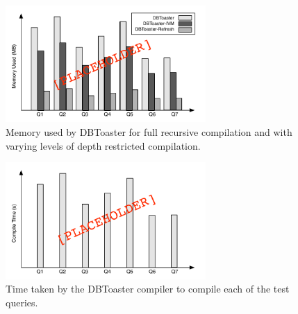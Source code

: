 \begin{figure}
\begin{center}
\includegraphics[width=3in]{../graphics-tmp/placeholder_memory_all}
\end{center}
\label{fig:exp:bakeoff}
\caption{Memory used by DBToaster for full recursive compilation and with varying levels of depth restricted compilation.}
\end{figure}


\begin{figure}
\begin{center}
\includegraphics[width=3in]{../graphics-tmp/placeholder_compile_all}
\end{center}
\label{fig:exp:bakeoff}
\caption{Time taken by the DBToaster compiler to compile each of the test queries.}
\end{figure}